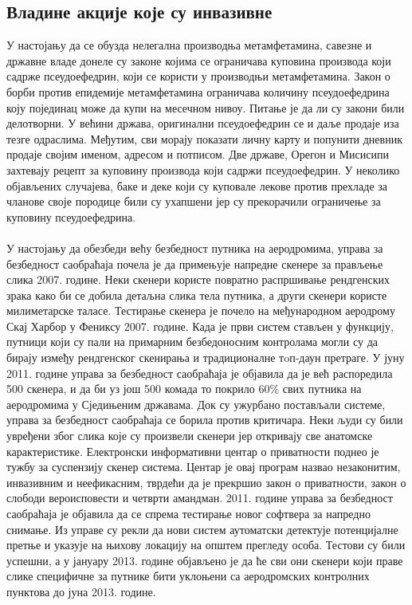 \documentclass{article}
\begin{document}
\subsection{Владине акције које су инвазивне}
У настојању да се обузда нелегална производња метамфетамина, савезне и државне владе донеле су законе којима се ограничава куповина производа који садрже псеудоефедрин, који се користи у производњи метамфетамина. Закон о борби против епидемије метамфетамина ограничава количину псеудоефедрина коју појединац може да купи на месечном нивоу. Питање је да ли су закони били делотворни. У већини држава, оригинални псеудоефедрин се и даље продаје иза тезге одраслима. Међутим, сви морају показати личну карту и попунити дневник продаје својим именом, адресом и потписом. Две државе, Орегон и Мисисипи захтевају рецепт за куповину производа који садржи псеудоефедрин. У неколико објављених случајева, баке и деке који су куповале лекове против прехладе за чланове своје породице били су ухапшени јер су прекорачили ограничење за куповину псеудоефедрина.
\\\\
У настојању да обезбеди већу безбедност путника на аеродромима, управа за безбедност саобраћаја почела је да примењује напредне скенере за прављење слика 2007. године. Неки скенери користе повратно распршивање рендгенских зрака како би се добила детаљна слика тела путника, а други скенери користе милиметарске таласе. Тестирање скенера је почело на међународном аеродрому Скај Харбор у Фениксу 2007. године. Када је први систем стављен у функцију, путници који су пали на примарним безбедоносним контролама могли су да бирају између рендгенског скенирања и традиционалне тoп-даун претраге. У јуну 2011. године управа за безбедност саобраћаја је објавила да је већ распоредила 500 скенера, и да би уз још 500 комада то покрило 60\% свих путника на аеродромима у Сједињеним државама. Док су ужурбано постављали системе, управа за безбедност саобраћаја се борила против критичара. Неки људи су били увређени због слика које су произвели скенери јер откривају све анатомске карактеристике. Електронски информативни центар о приватности поднео је тужбу за суспензију скенер система. Центар је овај програм назвао незаконитим, инвазивним и неефикасним, тврдећи да је прекршио закон о приватности, закон о слободи вероисповести и четврти амандман. 2011. године управа за безбедност саобраћаја је објавила да се спрема тестирање новог софтвера за напредно снимање. Из управе су рекли да нови систем аутоматски детектује потенцијалне претње и указује на њихову локацију на општем прегледу особа. Тестови су били успешни, а у јануару 2013. године објављено је да ће сви они скенери који праве слике специфичне за путнике бити уклоњени са аеродромских контролних пунктова до јуна 2013. године.
\end{document}
